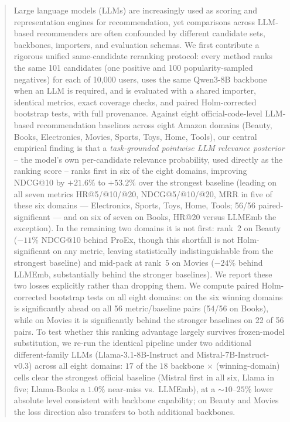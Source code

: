\begin{abstract}
Large language models (LLMs) are increasingly used as scoring and
representation engines for recommendation, yet comparisons across LLM-based
recommenders are often confounded by different candidate sets, backbones,
importers, and evaluation schemas. We first contribute a rigorous unified
same-candidate reranking protocol: every method ranks the same 101 candidates
(one positive and 100 popularity-sampled negatives) for each of 10{,}000 users,
uses the same Qwen3-8B backbone when an LLM is required, and is evaluated with a
shared importer, identical metrics, exact coverage checks, and paired
Holm-corrected bootstrap tests, with full provenance. Against eight
official-code-level LLM-based recommendation baselines across eight Amazon
domains (Beauty, Books, Electronics, Movies, Sports, Toys, Home, Tools), our
central empirical finding is that a \emph{task-grounded pointwise LLM relevance
posterior} -- the model's own per-candidate relevance probability, used directly
as the ranking score -- ranks first in six of the eight domains, improving
NDCG@10 by $+21.6\%$ to $+53.2\%$ over the strongest baseline (leading on all
seven metrics HR@5/@10/@20, NDCG@5/@10/@20, MRR in five of these six domains ---
Electronics, Sports, Toys, Home, Tools; 56/56 paired-significant --- and on six
of seven on Books, HR@20 versus LLMEmb the exception). In the remaining two
domains it is not first: rank~2 on Beauty ($-11\%$ NDCG@10 behind ProEx, though
this shortfall is not Holm-significant on any metric, leaving \method{}
statistically indistinguishable from the strongest baseline) and mid-pack at
rank~5 on Movies ($-24\%$ behind LLMEmb, substantially behind the stronger
baselines). We report these two losses explicitly rather than
dropping them. We compute paired Holm-corrected bootstrap tests on all eight
domains: on the six winning domains \method{} is significantly ahead on all 56
metric/baseline pairs (54/56 on Books), while on Movies it is significantly
behind the stronger baselines on 22 of 56 pairs. To test whether this ranking
advantage largely survives frozen-model substitution, we re-run the identical
pipeline under two additional different-family LLMs (Llama-3.1-8B-Instruct and
Mistral-7B-Instruct-v0.3) across all eight domains: $17$ of the
$18$ backbone$\,\times\,$(winning-domain) cells clear the strongest official
baseline (Mistral first in all six, Llama in five; Llama-Books a $1.0\%$
near-miss vs.\ LLMEmb), at a $\sim 10$--$25\%$ lower absolute level consistent
with backbone capability; on Beauty and Movies the loss direction also transfers
to both additional backbones.


\end{abstract}

